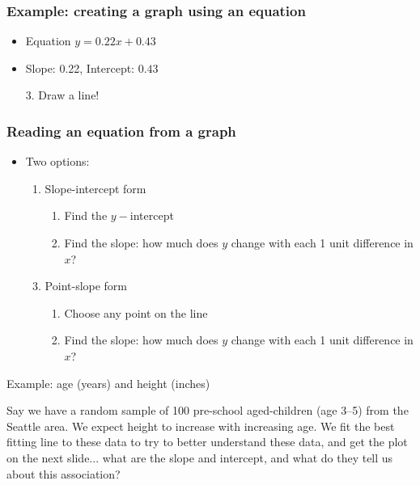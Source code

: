 \documentclass[11pt, hyperref={colorlinks, urlcolor=blue}]{beamer}
\newcommand{\myframe}[1]{\begin{frame} \frametitle{#1}}
\begin{document}
\myframe{Example: creating a graph using an equation}
\centering
\begin{itemize}
\item Equation $y = 0.22x + 0.43$
\item[]
\item Slope: 0.22, Intercept: $0.43$
\item[]
\item[3.] Draw a line!
\end{itemize}
\end{frame}

\myframe{Reading an equation from a graph}
\begin{itemize}
\item Two options:
\begin{enumerate}
\item Slope-intercept form
\begin{enumerate}
\item Find the $y-$intercept
\item Find the slope: how much does $y$ change with each 1 unit difference in $x$?
\end{enumerate}
\item[]
\item Point-slope form
\begin{enumerate}
\item Choose any point on the line
\item Find the slope: how much does $y$ change with each 1 unit difference in $x$?
\end{enumerate}
\end{enumerate}
\end{itemize}

Example: age (years) and height (inches)

Say we have a random sample of 100 pre-school aged-children (age 3--5) from the Seattle area. We expect height to increase with increasing age. We fit the best fitting line to these data to try to better understand these data, and get the plot on the next slide... what are the slope and intercept, and what do they tell us about this association?
\end{frame}
\end{document}
